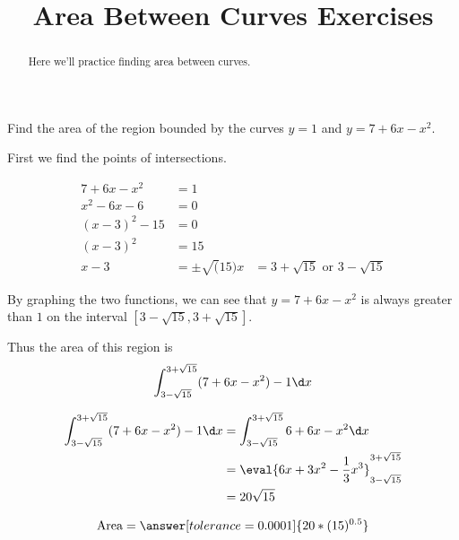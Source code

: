 \documentclass[handout]{ximera}
\title[Exercises:]{Area Between Curves Exercises}
\begin{document}
\begin{abstract}
  Here we'll practice finding area between curves.
\end{abstract}
\maketitle

\begin{exercise}
Find the area of the region bounded by the curves $y = 1$ and $y =7+6x-x^2$.

\begin{hint}
	First we find the points of intersections.
	
	\begin{align*}
	7+6x-x^2 &= 1\\
	x^2-6x-6 &=0\\
	(x-3)^2 - 15 &=0\\
    (x-3)^2 &= 15 \\
    x-3 &= \pm \sqrt(15)
	x &= 3 +\sqrt{15} \textrm{ or  }3 - \sqrt{15}
	\end{align*}
\end{hint}

\begin{hint}
	By graphing the two functions, we can see that $y =7+6x-x^2$ is always greater than $1$ on the interval $[3 - \sqrt{15}, 3 + \sqrt{15}]$.
\end{hint}

\begin{hint}
	Thus the area of this region is
	\[
	\int_{3-\sqrt{15}}^{3+\sqrt{15}} (7+6x-x^2) - 1 \d x
	\]
\end{hint}

\begin{hint}
	\begin{align*}
		\int_{3 - \sqrt{15}}^{3+\sqrt{15}} (7+6x-x^2) - 1 \d x &= \int_{3 - \sqrt{15}}^{3+\sqrt{15}} 6+6x-x^2 \d x\\
		&= \eval{6x+3x^2-\frac{1}{3}x^3}_{3 - \sqrt{15}}^{3+\sqrt{15}}\\
		&= 20\sqrt{15}
	\end{align*}
\end{hint}

	\[
		\textrm{Area} = \answer[tolerance = 0.0001]{20*(15)^{0.5}}
	\]

\end{exercise}
\end{document}
